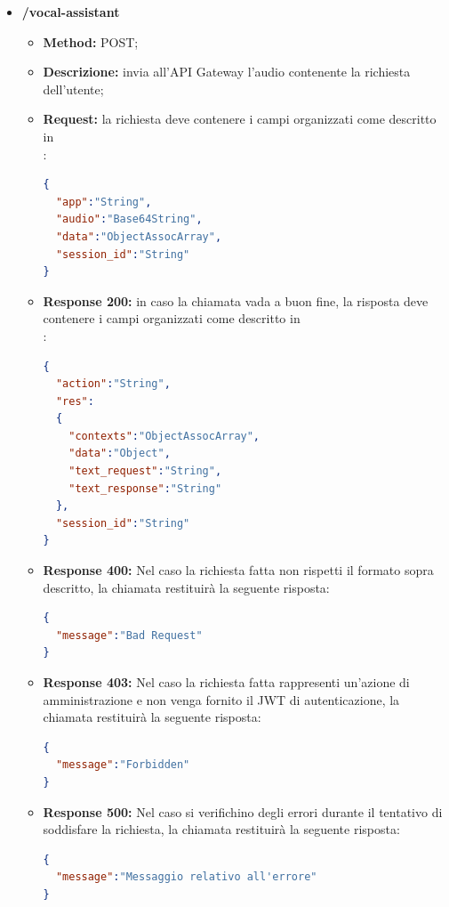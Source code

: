 	\begin{itemize}
		\item \textbf{/vocal-assistant}\\
		\begin{itemize}
			\item \textbf{Method:} POST;
			\item \textbf{Descrizione:} invia all'API Gateway l'audio contenente la richiesta dell'utente;
			\item \textbf{Request:} la richiesta deve contenere i campi organizzati come descritto in \\:
\begin{lstlisting}[language=json,firstnumber=1]
{
  "app":"String",
  "audio":"Base64String",
  "data":"ObjectAssocArray",
  "session_id":"String"
}
\end{lstlisting}
\item \textbf{Response 200:} in caso la chiamata vada a buon fine, la risposta deve contenere i campi organizzati come descritto in \\:
\begin{lstlisting}[language=json,firstnumber=1]
{
  "action":"String",
  "res":
  {
    "contexts":"ObjectAssocArray",
    "data":"Object",
    "text_request":"String",
    "text_response":"String"
  },
  "session_id":"String"
}
\end{lstlisting}
\item \textbf{Response 400:} Nel caso la richiesta fatta non rispetti il formato sopra descritto, la chiamata restituirà la seguente risposta:
\begin{lstlisting}[language=json,firstnumber=1]
{
  "message":"Bad Request"
}
\end{lstlisting}
\item \textbf{Response 403:} Nel caso la richiesta fatta rappresenti un'azione di amministrazione e non venga fornito il JWT di autenticazione, la chiamata restituirà la seguente risposta:
\begin{lstlisting}[language=json,firstnumber=1]
{
  "message":"Forbidden"
}
\end{lstlisting}
\item \textbf{Response 500:} Nel caso si verifichino degli errori durante il tentativo di soddisfare la richiesta, la chiamata restituirà la seguente risposta:
\begin{lstlisting}[language=json,firstnumber=1]
{
  "message":"Messaggio relativo all'errore"
}
\end{lstlisting}
\end{itemize}
\end{itemize}

